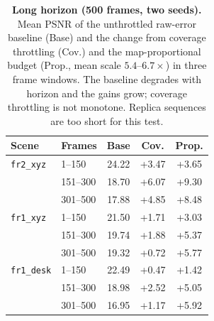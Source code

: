 \begin{table}[tbp]
\centering
\footnotesize\setlength{\tabcolsep}{3pt}
\begin{tabular}{llccc}
\toprule
\textbf{Scene} & \textbf{Frames} & \textbf{Base} & \textbf{Cov.} & \textbf{Prop.} \\
\midrule
\texttt{fr2\_xyz} & 1--150 & 24.22 & +3.47 & +3.65 \\
 & 151--300 & 18.70 & +6.07 & +9.30 \\
 & 301--500 & 17.88 & +4.85 & +8.48 \\
\midrule
\texttt{fr1\_xyz} & 1--150 & 21.50 & +1.71 & +3.03 \\
 & 151--300 & 19.74 & +1.88 & +5.37 \\
 & 301--500 & 19.32 & +0.72 & +5.77 \\
\midrule
\texttt{fr1\_desk} & 1--150 & 22.49 & +0.47 & +1.42 \\
 & 151--300 & 18.98 & +2.52 & +5.05 \\
 & 301--500 & 16.95 & +1.17 & +5.92 \\
\bottomrule
\end{tabular}
\caption{\textbf{Long horizon (500 frames, two seeds).} Mean PSNR of the unthrottled raw-error baseline (Base) and the change from coverage throttling (Cov.) and the map-proportional budget (Prop., mean scale $5.4$--$6.7\times$) in three frame windows. The baseline degrades with horizon and the gains grow; coverage throttling is not monotone. Replica sequences are too short for this test.}
\label{tab:long}
\end{table}
